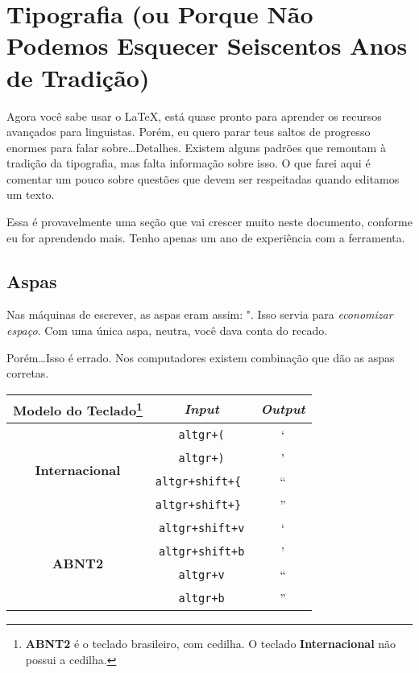 \chapter[Tipografia]{Tipografia (ou Porque Não Podemos Esquecer Seiscentos Anos de Tradição)}

Agora você sabe usar o \LaTeX{}, está quase pronto para aprender os recursos avançados para linguistas. Porém, eu quero parar teus saltos de progresso enormes para falar sobre\ldots Detalhes. Existem alguns padrões que remontam à tradição da tipografia, mas falta informação sobre isso. O que farei aqui é comentar um pouco sobre questões que devem ser respeitadas quando editamos um texto.

Essa é provavelmente uma seção que vai crescer muito neste documento, conforme eu for aprendendo mais. Tenho apenas um ano de experiência com a ferramenta.

\section{Aspas}

Nas máquinas de escrever, as aspas eram assim: "\@. Isso servia para \emph{economizar espaço}. Com uma única aspa, neutra, você dava conta do recado.

Porém\ldots Isso é errado. Nos computadores existem combinação que dão as aspas corretas.

\begin{center}
\begin{tabular}{c c c}
\bf Modelo do Teclado\footnote{\textbf{ABNT2} é o teclado brasileiro, com cedilha. O teclado \textbf{Internacional} não possui a cedilha.} & \bf \emph{Input} & \bf \emph{Output} \\
\hline
\multirow{4}{*}{\bf Internacional}	& \texttt{altgr+(} & ‘ \\
					& \texttt{altgr+)} & ’ \\
					& \texttt{altgr+shift+\{ } & “ \\
					& \texttt{altgr+shift+\} } & ” \\
\hline
\multirow{4}{*}{\bf ABNT2}		& \texttt{altgr+shift+v}  & ‘ \\
					& \texttt{altgr+shift+b}  & ’ \\
					& \texttt{altgr+v} & “ \\
					& \texttt{altgr+b} & ” \\
\end{tabular}
\end{center}

